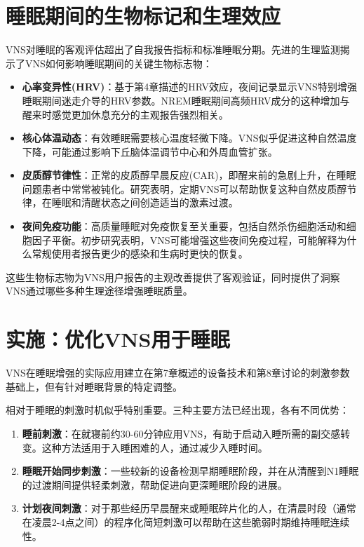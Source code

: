 \documentclass[
  Letterpaper,
]{scrbook}
\begin{document}
\section{睡眠期间的生物标记和生理效应}\label{ux7761ux7720ux671fux95f4ux7684ux751fux7269ux6807ux8bb0ux548cux751fux7406ux6548ux5e94}

VNS对睡眠的客观评估超出了自我报告指标和标准睡眠分期。先进的生理监测揭示了VNS如何影响睡眠期间的关键生物标志物：

\begin{itemize}
\item
  \textbf{心率变异性(HRV)}：基于第4章描述的HRV效应，夜间记录显示VNS特别增强睡眠期间迷走介导的HRV参数。NREM睡眠期间高频HRV成分的这种增加与醒来时感觉更加休息充分的主观报告强烈相关。
\item
  \textbf{核心体温动态}：有效睡眠需要核心温度轻微下降。VNS似乎促进这种自然温度下降，可能通过影响下丘脑体温调节中心和外周血管扩张。
\item
  \textbf{皮质醇节律性}：正常的皮质醇早晨反应(CAR)，即醒来前的急剧上升，在睡眠问题患者中常常被钝化。研究表明，定期VNS可以帮助恢复这种自然皮质醇节律，在睡眠和清醒状态之间创造适当的激素过渡。
\item
  \textbf{夜间免疫功能}：高质量睡眠对免疫恢复至关重要，包括自然杀伤细胞活动和细胞因子平衡。初步研究表明，VNS可能增强这些夜间免疫过程，可能解释为什么常规使用者报告更少的感染和生病时更快的恢复。
\end{itemize}

这些生物标志物为VNS用户报告的主观改善提供了客观验证，同时提供了洞察VNS通过哪些多种生理途径增强睡眠质量。

\section{实施：优化VNS用于睡眠}\label{ux5b9eux65bdux4f18ux5316vnsux7528ux4e8eux7761ux7720}

VNS在睡眠增强的实际应用建立在第7章概述的设备技术和第8章讨论的刺激参数基础上，但有针对睡眠背景的特定调整。

相对于睡眠的刺激时机似乎特别重要。三种主要方法已经出现，各有不同优势：

\begin{enumerate}
\def\labelenumi{\arabic{enumi}.}
\item
  \textbf{睡前刺激}：在就寝前约30-60分钟应用VNS，有助于启动入睡所需的副交感转变。这种方法适用于入睡困难的人，通过减少入睡时间。
\item
  \textbf{睡眠开始同步刺激}：一些较新的设备检测早期睡眠阶段，并在从清醒到N1睡眠的过渡期间提供轻柔刺激，帮助促进向更深睡眠阶段的进展。
\item
  \textbf{计划夜间刺激}：对于那些经历早晨醒来或睡眠碎片化的人，在清晨时段（通常在凌晨2-4点之间）的程序化简短刺激可以帮助在这些脆弱时期维持睡眠连续性。
\end{enumerate}
\end{document}
